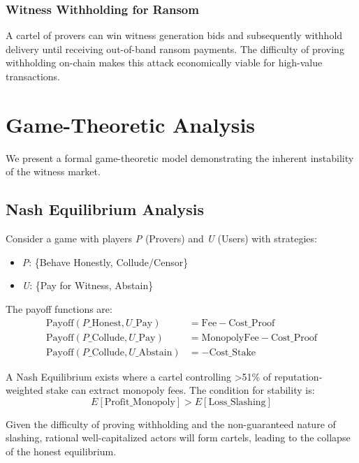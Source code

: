 \documentclass{article}
\begin{document}
\subsubsection{Witness Withholding for Ransom}

A cartel of provers can win witness generation bids and subsequently withhold delivery until receiving out-of-band ransom payments. The difficulty of proving withholding on-chain makes this attack economically viable for high-value transactions.

\section{Game-Theoretic Analysis}

We present a formal game-theoretic model demonstrating the inherent instability of the witness market.

\subsection{Nash Equilibrium Analysis}

Consider a game with players \textit{P} (Provers) and \textit{U} (Users) with strategies:
\begin{itemize}
\item \textit{P}: \{Behave Honestly, Collude/Censor\}
\item \textit{U}: \{Pay for Witness, Abstain\}
\end{itemize}

The payoff functions are:
\begin{align}
\text{Payoff}(P\_{\text{Honest}}, U\_{\text{Pay}}) &= \text{Fee} - \text{Cost}\_{\text{Proof}} \\
\text{Payoff}(P\_{\text{Collude}}, U\_{\text{Pay}}) &= \text{MonopolyFee} - \text{Cost}\_{\text{Proof}} \\
\text{Payoff}(P\_{\text{Collude}}, U\_{\text{Abstain}}) &= -\text{Cost}\_{\text{Stake}}
\end{align}

A Nash Equilibrium exists where a cartel controlling >51\% of reputation-weighted stake can extract monopoly fees. The condition for stability is:
$$E[\text{Profit}\_{\text{Monopoly}}] > E[\text{Loss}\_{\text{Slashing}}]$$

Given the difficulty of proving withholding and the non-guaranteed nature of slashing, rational well-capitalized actors will form cartels, leading to the collapse of the honest equilibrium.
\end{document}
